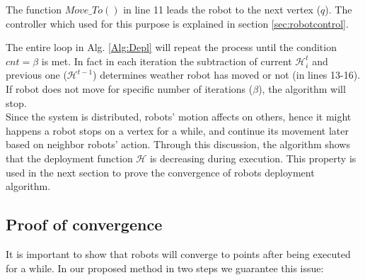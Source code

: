 \documentclass[twocolumn]{svjour3}       %
\begin{document}
The function $Move\_To()$ in line 11 leads the robot to the next vertex ($q$). The controller which used for this purpose is explained in section \ref{sec:robotcontrol}. 

The entire loop in Alg. \ref{Alg:Depl} will repeat the process until the condition $cnt=\beta$ is met. In fact in each iteration the subtraction of current $\mathcal H_i^t$ and previous one ($\mathcal{H}^{t-1}$) determines weather robot has moved or not (in lines 13-16). If robot does not move for specific number of iterations ($\beta$), the algorithm will stop. 
\\
Since the system is distributed, robots' motion affects on others, hence it might happens a robot stops on a vertex for a while, and continue its movement later based on neighbor robots' action. Through this discussion, the algorithm shows that the deployment function $\mathcal{H}$ is decreasing during execution. This property is used in the next section to prove the convergence of robots deployment algorithm.

\subsection{Proof of convergence}

It is important to show that robots will converge to points after being executed for a while. 
In our proposed method in two steps we guarantee this issue:
\end{document}
